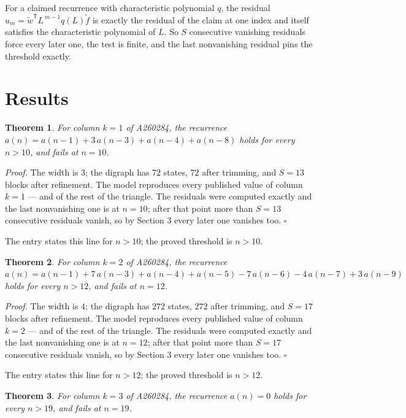 \documentclass[11pt]{article}
\newtheorem{theorem}{Theorem}
\theoremstyle{definition}
\begin{document}
For a claimed recurrence with characteristic polynomial $q$, the residual $u_m = \tilde w^{\mathsf T}L^{\,m-1}q(L)\tilde f$ is exactly the residual of the claim at one index and itself satisfies the characteristic polynomial of $L$. So $S$ consecutive vanishing residuals force every later one, the test is finite, and the last nonvanishing residual pins the threshold exactly.

\section{Results}

\begin{theorem} For column $k = 1$ of A260284, the recurrence $a(n) = a(n-1) + 3\,a(n-3) + a(n-4) + a(n-8)$ holds for every $n > 10$, and fails at $n = 10$.\end{theorem}

{\itshape Proof.} The width is $3$; the digraph has $72$ states, $72$ after trimming, and $S = 13$ blocks after refinement. The model reproduces every published value of column $k = 1$ --- and of the rest of the triangle. The residuals were computed exactly and the last nonvanishing one is at $n = 10$; after that point more than $S = 13$ consecutive residuals vanish, so by Section 3 every later one vanishes too. $\square$

The entry states this line for $n > 10$; the proved threshold is $n > 10$.

\begin{theorem} For column $k = 2$ of A260284, the recurrence $a(n) = a(n-1) + 7\,a(n-3) + a(n-4) + a(n-5) - 7\,a(n-6) - 4\,a(n-7) + 3\,a(n-9)$ holds for every $n > 12$, and fails at $n = 12$.\end{theorem}

{\itshape Proof.} The width is $4$; the digraph has $272$ states, $272$ after trimming, and $S = 17$ blocks after refinement. The model reproduces every published value of column $k = 2$ --- and of the rest of the triangle. The residuals were computed exactly and the last nonvanishing one is at $n = 12$; after that point more than $S = 17$ consecutive residuals vanish, so by Section 3 every later one vanishes too. $\square$

The entry states this line for $n > 12$; the proved threshold is $n > 12$.

\begin{theorem} For column $k = 3$ of A260284, the recurrence $a(n) = 0$ holds for every $n > 19$, and fails at $n = 19$.\end{theorem}
\end{document}
